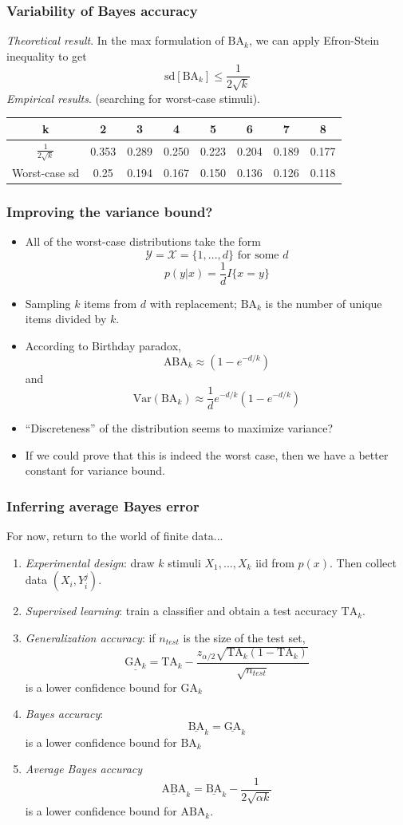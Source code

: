 \documentclass{beamer}
\begin{document}
\begin{frame}
\frametitle{Variability of Bayes accuracy}

\emph{Theoretical result}. In the max formulation of $\text{BA}_k$, we
can apply Efron-Stein inequality to get
\[
\text{sd}[\text{BA}_k] \leq \frac{1}{2\sqrt{k}}
\]
\vspace{0.2in}
\emph{Empirical results}. (searching for worst-case stimuli).
\begin{tabular}{c||c|c|c|c|c|c|c}
k & 2 & 3 & 4 & 5 & 6 & 7 & 8\\\hline
$\frac{1}{2\sqrt{k}}$ & 0.353 & 0.289 & 0.250 & 0.223 & 0.204 & 0.189 & 0.177\\\hline
Worst-case sd & 0.25 & 0.194 & 0.167 & 0.150 & 0.136 & 0.126 & 0.118
\end{tabular}
\end{frame}

\begin{frame}
\frametitle{Improving the variance bound?}
\begin{itemize}
\item All of the worst-case distributions take the form
\[
\mathcal{Y} = \mathcal{X} = \{1,...,d\} \text{ for some } d
\]
\[
p(y|x) = \frac{1}{d}I\{x = y\}
\]
\item Sampling $k$ items from $d$ with replacement; $\text{BA}_k$ is the number of unique items divided by $k$.
\item According to Birthday paradox, 
\[\text{ABA}_k \approx (1-e^{-d/k})\]
and 
\[
\text{Var}(\text{BA}_k) \approx \frac{1}{d}e^{-d/k}(1-e^{-d/k})
\]
\item ``Discreteness'' of the distribution seems to maximize variance?
\item If we could prove that this is indeed the worst case, then we have a better constant for variance bound.
\end{itemize}
\end{frame}

\begin{frame}
\frametitle{Inferring average Bayes error}
For now, return to the world of finite data...
\begin{enumerate}
\item \emph{Experimental design}: draw $k$ stimuli $X_1,...,X_k$ iid from $p(x)$.  Then collect data $(X_i, Y_i^j)$.
\item \emph{Supervised learning}: train a classifier and obtain a test accuracy $\text{TA}_k$.
\item \emph{Generalization accuracy}: if $n_{test}$ is the size of the test set,
\[
\underline{\text{GA}_k} = \text{TA}_k - \frac{z_{\alpha/2}\sqrt{\text{TA}_k (1-\text{TA}_k)}}{\sqrt{n_{test}}}
\]
 is a lower confidence bound for $\text{GA}_k$
\item \emph{Bayes accuracy}:
\[
\underline{\text{BA}}_k =  \underline{\text{GA}}_k
\]
is a lower confidence bound for $\text{BA}_k$
\item \emph{Average Bayes accuracy}
\[
\underline{\text{ABA}}_k =  \underline{\text{BA}}_k - \frac{1}{2\sqrt{\alpha k}}
\]
is a lower confidence bound for $\text{ABA}_k$.
\end{enumerate}
\end{frame}
\end{document}
